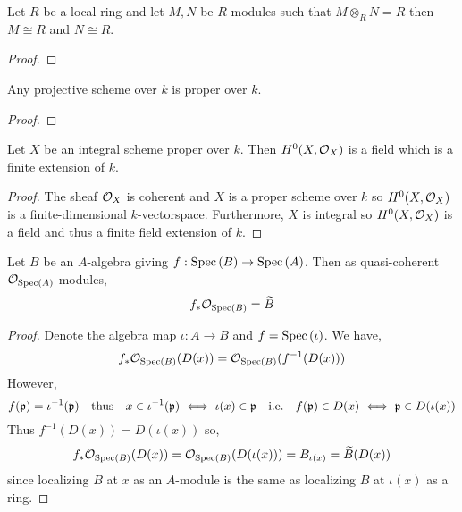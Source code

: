 \documentclass[12pt]{article}
\begin{document}
\begin{lemma} \label{tensor_inverse}
Let $R$ be a local ring and let $M, N$ be $R$-modules such that $M \otimes_R N = R$ then $M \cong R$ and $N \cong R$.
\end{lemma}

\begin{proof}

\end{proof}

\begin{lemma} \label{projective_scheme_proper}
Any projective scheme over $k$ is proper over $k$.
\end{lemma}

\begin{proof}

\end{proof}

\begin{lemma} \label{global_sections_proper_scheme}
Let $X$ be an integral scheme proper over $k$. Then $H^0(X, \mathcal{O}_{X})$ is a field which is a finite extension of $k$. 
\end{lemma}

\begin{proof}
The sheaf $\mathcal{O}_{X}$ is coherent and $X$ is a proper scheme over $k$ so $H^0(X, \mathcal{O}_{X})$ is a finite-dimensional $k$-vectorspace. Furthermore, $X$ is integral so $H^0(X, \mathcal{O}_{X})$ is a field and thus a finite field extension of $k$.
\end{proof}

\begin{lemma}
Let $B$ be an $A$-algebra giving $f : \mathrm{Spec}\left( B \right) \to \mathrm{Spec}\left( A \right)$. Then as quasi-coherent $\mathcal{O}_{\mathrm{Spec}\left( A \right)}$-modules,
 \[ f_* \mathcal{O}_{\mathrm{Spec}\left( B \right)} = \widetilde{B} \]
\end{lemma}

\begin{proof}
Denote the algebra map $\iota : A \to B$ and $f = \mathrm{Spec}\left( \iota \right)$. We have, 
\[ f_* \mathcal{O}_{\mathrm{Spec}\left( B \right)}(D(x)) = \mathcal{O}_{\mathrm{Spec}\left( B \right)}(f^{-1}(D(x))) \] However, 
\[ f(\mathfrak{p}) = \iota^{-1}(\mathfrak{p}) \quad \text{thus} \quad x \in \iota^{-1}(\mathfrak{p}) \iff \iota(x) \in \mathfrak{p} \quad \text{i.e.} \quad f(\mathfrak{p}) \in D(x) \iff \mathfrak{p} \in D(\iota(x)) \] Thus $f^{-1}(D(x)) = D(\iota(x))$ so,
\[ f_* \mathcal{O}_{\mathrm{Spec}\left( B \right)}(D(x)) = \mathcal{O}_{\mathrm{Spec}\left( B \right)}(D(\iota(x))) = B_{\iota(x)}  = \widetilde{B}(D(x)) \]
since localizing $B$ at $x$ as an $A$-module is the same as localizing $B$ at $\iota(x)$ as a ring.
\end{proof}
\end{document}
